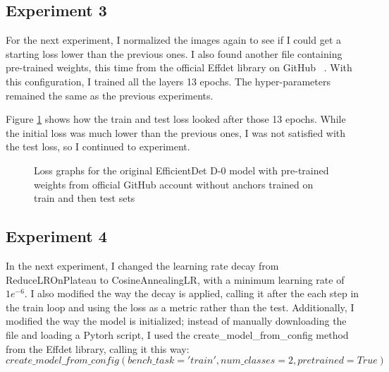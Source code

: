 \subsection{Experiment 3}

For the next experiment, I normalized the images again to see if I could get a starting loss lower than the previous ones. I also found another file containing pre-trained weights, this time from the official Effdet library on GitHub ~\cite{link7}. With this configuration, I trained all the layers 13 epochs. The hyper-parameters remained the same as the previous experiments. 

Figure \ref{fig:fig27} shows how the train and test loss looked after those 13 epochs. While the initial loss was much lower than the previous ones, I was not satisfied with the test loss, so I continued to experiment.

\begin{figure}[!ht]
    \label{fig:fig27}
    \caption{Loss graphs for the original EfficientDet D-0 model with pre-trained weights from official GitHub account without anchors trained on train and then test sets}
\end{figure}

\subsection{Experiment 4}

In the next experiment, I changed the learning rate decay from ReduceLROnPlateau to CosineAnnealingLR, with a minimum learning rate of $1e^{-6}$. I also modified the way the decay is applied, calling it after the each step in the train loop and using the loss as a metric rather than the test. Additionally, I modified the way the model is initialized; instead of manually downloading the file and loading a Pytorh script, I used the create\_model\_from\_config method from the Effdet library, calling it this way: \[
create\_model\_from\_config(bench\_task='train', num\_classes=2, pretrained=True)\]

